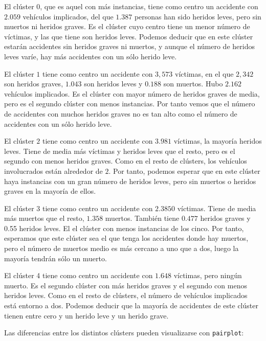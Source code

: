 \documentclass[a4]{article}
\begin{document}
El clúster $0$, que es aquel con más instancias, tiene como centro un accidente con $2.059$ vehículos implicados, del que $1.387$ personas han sido heridos leves, pero sin muertos ni heridos graves. Es el clúster cuyo centro tiene un menor número de víctimas, y las que tiene son heridos leves. Podemos deducir que en este clúster estarán accidentes sin heridos graves ni muertos, y aunque el número de heridos leves varíe, hay más accidentes con un sólo herido leve.

El clúster $1$ tiene como centro un accidente con $3,573$ víctimas, en el que $2,342$ son heridos graves, $1.043$ son heridos leves y $0.188$ son muertos. Hubo $2.162$ vehículos implicados. Es el clúster con mayor número de heridos graves de media, pero es el segundo clúster con menos instancias. Por tanto vemos que el número de accidentes con muchos heridos graves no es tan alto como el número de accidentes con un sólo herido leve.

El clúster $2$ tiene como centro un accidente con $3.981$ víctimas, la mayoría heridos leves. Tiene de media más víctimas y heridos leves que el resto, pero es el segundo con menos heridos graves. Como en el resto de clústers, los vehículos involucrados están alrededor de $2$. Por tanto, podemos esperar que en este clúster haya instancias con un gran número de heridos leves, pero sin muertos o heridos graves en la mayoría de ellos.

El clúster $3$ tiene como centro un accidente con $2.3850$ víctimas. Tiene de media más muertos que el resto, $1.358$ muertos. También tiene $0.477$ heridos graves y 0.55 heridos leves. El el clúster con menos instancias de los cinco. Por tanto, esperamos que este clúster sea el que tenga los accidentes donde hay muertos, pero el número de muertos medio es más cercano a uno que a dos, luego la mayoría tendrán sólo un muerto.

El clúster 4 tiene como centro un accidente con $1.648$ víctimas, pero ningún muerto. Es el segundo clúster con más heridos graves y el segundo con menos heridos leves. Como en el resto de clústers, el número de vehículos implicados está entorno a dos. Podemos deducir que la mayoría de accidentes de este clúster tienen entre cero y un herido leve y un herido grave.

Las diferencias entre los distintos clústers pueden visualizarse con \texttt{pairplot}:
\end{document}
